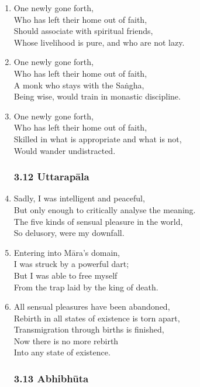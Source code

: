 \documentclass[10pt, openany]{book}
\begin{document}
\begin{enumerate}
\item One newly gone forth,\\
Who has left their home out of faith,\\
Should associate with spiritual friends,\\
Whose livelihood is pure, and who are not lazy.

\item One newly gone forth,\\
Who has left their home out of faith,\\
A monk who stays with the Saṅgha,\\
Being wise, would train in monastic discipline.

\item One newly gone forth,\\
Who has left their home out of faith,\\
Skilled in what is appropriate and what is not,\\
Would wander undistracted.

\subsubsection*{3.12 Uttarapāla}

\item Sadly, I was intelligent and peaceful,\\
But only enough to critically analyse the meaning.\\
The five kinds of sensual pleasure in  the world,\\
So delusory, were my downfall.

\item Entering into Māra’s domain,\\
I was struck by a powerful dart;\\
But I was able to free myself\\
From the trap laid by the king of death.

\item All sensual pleasures have been abandoned,\\
Rebirth in all states of existence is torn apart,\\
Transmigration through births is finished,\\
Now there is no more rebirth \\
Into any state of existence.

\subsubsection*{3.13 Abhibhūta}


\end{enumerate}
\end{document}
